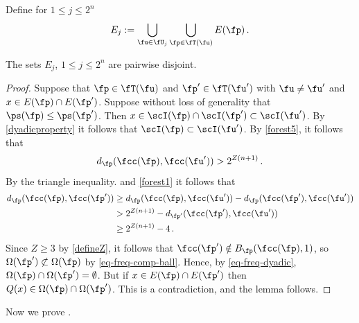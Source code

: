 Define for $1 \le j \le 2^n$
$$
    E_j := \bigcup_{\fu \in \fU_j} \bigcup_{\fp \in \fT(\fu)} E(\fp)\,.
$$

\begin{lemma}
    \label{disjoint-row-support}
    \leanok
    The sets $E_j$, $1 \le j \le 2^n$ are pairwise disjoint.
\end{lemma}

\begin{proof}
    Suppose that $\fp \in \fT(\fu)$ and $\fp' \in \fT(\fu')$ with $\fu \ne \fu'$ and $x \in E(\fp) \cap E(\fp')$. Suppose without loss of generality that $\ps(\fp) \le \ps(\fp')$. Then $x \in \scI(\fp) \cap \scI(\fp') \subset \scI(\fu')$. By \eqref{dyadicproperty} it follows that $\scI(\fp) \subset \scI(\fu')$. By \eqref{forest5}, it follows that
    $$
        d_{\fp}(\fcc(\fp), \fcc(\fu')) > 2^{Z(n+1)}\,.
    $$
    By the triangle inequality.  and \eqref{forest1} it follows that
    \begin{align*}
        d_{\fp}(\fcc(\fp), \fcc(\fp')) &\ge d_{\fp}(\fcc(\fp), \fcc(\fu')) - d_{\fp}(\fcc(\fp'), \fcc(\fu'))\\
        &> 2^{Z(n+1)} - d_{\fp'}(\fcc(\fp'), \fcc(\fu'))\\
        &\ge 2^{Z(n+1)} - 4\,.
    \end{align*}
    Since $Z \ge 3$ by \eqref{defineZ}, it follows that $\fcc(\fp') \notin B_{\fp}(\fcc(\fp), 1)$, so $\Omega(\fp') \not\subset \Omega(\fp)$ by \eqref{eq-freq-comp-ball}. Hence, by \eqref{eq-freq-dyadic}, $\Omega(\fp) \cap \Omega(\fp') = \emptyset$. But if $x \in E(\fp) \cap E(\fp')$ then $Q(x) \in \Omega(\fp) \cap \Omega(\fp')$. This is a contradiction, and the lemma follows.
\end{proof}

Now we prove .

